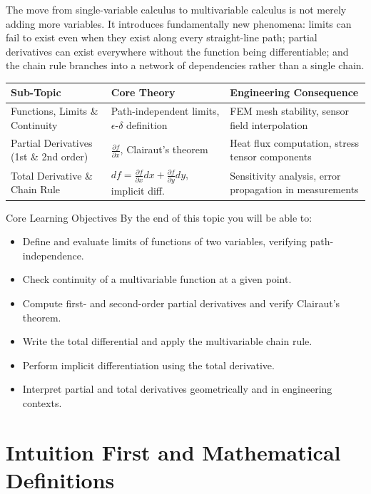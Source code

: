 \documentclass[12pt,a4paper]{article}
\begin{document}
The move from single-variable calculus to multivariable calculus is not merely adding more variables. It introduces fundamentally new phenomena: limits can fail to exist even when they exist along every straight-line path; partial derivatives can exist everywhere without the function being differentiable; and the chain rule branches into a network of dependencies rather than a single chain.

\begin{center}
\begin{tabular}{@{}lll@{}}
\toprule
\textbf{Sub-Topic} & \textbf{Core Theory} & \textbf{Engineering Consequence} \\
\midrule
Functions, Limits \& Continuity & Path-independent limits, \(\epsilon\text{-}\delta\) definition & FEM mesh stability, sensor field interpolation \\
Partial Derivatives (1st \& 2nd order) & \(\frac{\partial f}{\partial x}\), Clairaut's theorem & Heat flux computation, stress tensor components \\
Total Derivative \& Chain Rule & \(df = \frac{\partial f}{\partial x}dx + \frac{\partial f}{\partial y}dy\), implicit diff. & Sensitivity analysis, error propagation in measurements \\
\bottomrule
\end{tabular}
\end{center}

\begin{learnbox}{Core Learning Objectives}
By the end of this topic you will be able to:
\begin{itemize}
  \item Define and evaluate limits of functions of two variables, verifying path-independence.
  \item Check continuity of a multivariable function at a given point.
  \item Compute first- and second-order partial derivatives and verify Clairaut's theorem.
  \item Write the total differential and apply the multivariable chain rule.
  \item Perform implicit differentiation using the total derivative.
  \item Interpret partial and total derivatives geometrically and in engineering contexts.
\end{itemize}
\end{learnbox}

\section{Intuition First and Mathematical Definitions}
\end{document}
